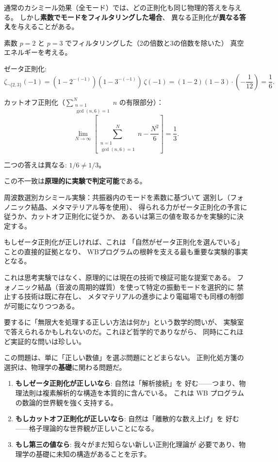 \documentclass[11pt,a4paper]{article}
\theoremstyle{definition}
\begin{document}
通常のカシミール効果（全モード）では、どの正則化も同じ物理的答えを与える。
しかし\textbf{素数でモードをフィルタリングした場合}、
異なる正則化が\textbf{異なる答え}を与えることがある。

\begin{keybox}[レギュレーター予想]
素数 $p=2$ と $p=3$ でフィルタリングした（2の倍数と3の倍数を除いた）
真空エネルギーを考える。

ゼータ正則化:
\[
  \zeta_{\neg\{2,3\}}(-1)
  = (1-2^{-(-1)})(1-3^{-(-1)})\,\zeta(-1)
  = (1-2)(1-3)\cdot\left(-\frac{1}{12}\right)
  = \frac{1}{6}.
\]

カットオフ正則化（$\sum_{\substack{n=1 \\ \gcd(n,6)=1}}^{N} n$ の有限部分）：
\[
  \lim_{N\to\infty}\left[\sum_{\substack{n=1 \\ \gcd(n,6)=1}}^{N} n
  - \frac{N^2}{6}\right]
  = \frac{1}{3}.
\]

二つの答えは異なる: $1/6 \neq 1/3$。
\end{keybox}

この不一致は\textbf{原理的に実験で判定可能}である。

\begin{hypbox}
周波数選別カシミール実験：共振器内のモードを素数に基づいて
選別し（フォノニック結晶、メタマテリアル等を使用）、
得られる力がゼータ正則化の予言に従うか、カットオフ正則化に従うか、
あるいは第三の値を取るかを実験的に決定する。

もしゼータ正則化が正しければ、これは
「自然がゼータ正則化を選んでいる」ことの直接的証拠となり、
WBプログラムの根幹を支える最も重要な実験的事実となる。
\end{hypbox}

\begin{hsbox}
これは思考実験ではなく、原理的には現在の技術で検証可能な提案である。
フォノニック結晶（音波の周期的媒質）を使って特定の振動モードを選択的に
禁止する技術は既に存在し、
メタマテリアルの進歩により電磁場でも同様の制御が可能になりつつある。

要するに「無限大を処理する正しい方法は何か」という数学的問いが、
実験室で答えられるかもしれないのだ。これほど哲学的でありながら、
同時にこれほど実証的な問いは珍しい。
\end{hsbox}

この問題は、単に「正しい数値」を選ぶ問題にとどまらない。
正則化処方箋の選択は、物理学の\textbf{基礎}に関わる問題だ。

\begin{enumerate}
  \item \textbf{もしゼータ正則化が正しいなら}: 自然は「解析接続」を
        好む——つまり、物理法則は複素解析的な構造を本質的に含んでいる。
        これは WB プログラムの数論的世界観を強く支持する。
  \item \textbf{もしカットオフ正則化が正しいなら}: 自然は「離散的な数え上げ」を
        好む——格子理論的な世界観が正しいことになる。
  \item \textbf{もし第三の値なら}: 我々がまだ知らない新しい正則化理論が
        必要であり、物理学の基礎に未知の構造があることを示す。
\end{enumerate}
\end{document}
